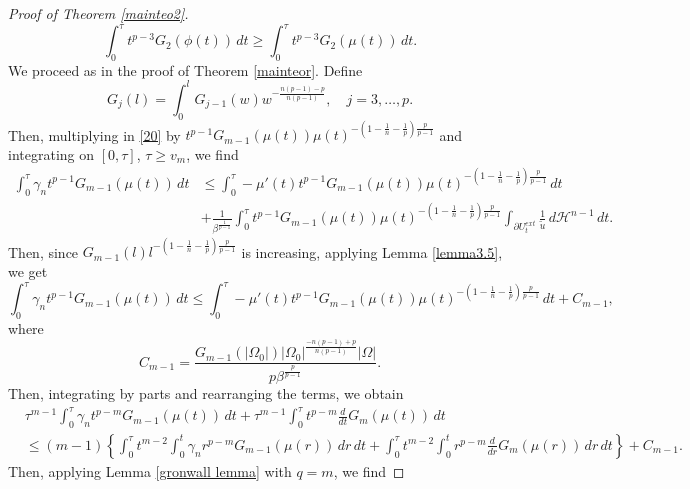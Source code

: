 \documentclass[12pt]{article}
\newcommand{\abs}[1]{{\left|#1\right|}}
\newcommand{\dH}{d\mathcal{H}^{n-1}}
\theoremstyle{definition}
\theoremstyle{plain}
\theoremstyle{definition}
\begin{document}
\begin{proof}[Proof of Theorem \ref{mainteo2}]
\begin{equation*}
        \int_0^\tau t^{p-3}G_2(\phi(t))\,dt\geq \int_0^\tau t^{p-3}G_2(\mu(t))\,dt.
    \end{equation*}
    We proceed as in the proof of Theorem \ref{mainteor}. Define
    \begin{equation*}
        G_j(l)=\int_0^l G_{j-1}(w)w^{-\frac{n(p-1)-p}{n(p-1)}}, \quad j=3,\dots,p.
    \end{equation*}
    Then, multiplying in \eqref{20} by $t^{p-1}G_{m-1}(\mu(t))\mu(t)^{-\left(1-\frac{1}{n}-\frac{1}{p}\right)\frac{p}{p-1}}$ and integrating on $[0,\tau]$, $\tau\geq v_m$, we find
    \begin{equation*}
        \begin{split}
            \int_0^\tau \gamma_nt^{p-1}G_{m-1}(\mu(t))\,dt&\leq \int_0^\tau -\mu'(t)t^{p-1}G_{m-1}(\mu(t))\mu(t)^{-\left(1-\frac{1}{n}-\frac{1}{p}\right)\frac{p}{p-1}}\,dt\\
            &+\frac{1}{\beta^\frac{1}{p-1}}\int_0^\tau t^{p-1}G_{m-1}(\mu(t))\mu(t)^{-\left(1-\frac{1}{n}-\frac{1}{p}\right)\frac{p}{p-1}}\int_{\partial U_t^{ext}}\frac{1}{\tilde u}\,\dH\,dt.
        \end{split}
    \end{equation*}
    Then, since $G_{m-1}(l)l^{-\left(1-\frac{1}{n}-\frac{1}{p}\right)\frac{p}{p-1}}$ is increasing, applying Lemma \ref{lemma3.5}, we get
    \begin{equation*}
        \int_0^\tau \gamma_nt^{p-1}G_{m-1}(\mu(t))\,dt\leq\int_0^\tau -\mu'(t)t^{p-1}G_{m-1}(\mu(t))\mu(t)^{-\left(1-\frac{1}{n}-\frac{1}{p}\right)\frac{p}{p-1}}\,dt+C_{m-1},
    \end{equation*}
    where 
    \begin{equation*}
        C_{m-1}=\frac{G_{m-1}(\abs{\Omega_0})\abs{\Omega_0}^{\frac{-n(p-1)+p}{n(p-1)}}\abs{\Omega}}{p\beta^\frac{p}{p-1}}.
    \end{equation*}
    Then, integrating by parts and rearranging the terms, we obtain
    \begin{equation*}
        \begin{split}
            &\tau^{m-1}\int_0^\tau \gamma_nt^{p-m}G_{m-1}(\mu(t))\,dt+\tau^{m-1}\int_0^\tau t^{p-m}\frac{d}{dt}G_m(\mu(t))\,dt\\
            &\leq (m-1)\left\{\int_0^\tau t^{m-2}\int_0^t\gamma_n r^{p-m}G_{m-1}(\mu(r))\,dr\,dt+\int_0^\tau t^{m-2}\int_0^t r^{p-m}\frac{d}{dr}G_m(\mu(r))\,dr\,dt \right\}+C_{m-1}.
        \end{split}
    \end{equation*}
    Then, applying Lemma \ref{gronwall lemma} with $q=m$, we find

\end{proof}
\end{document}
